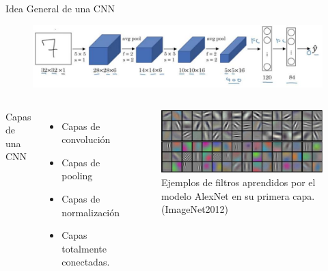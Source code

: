 \begin{frame}{Idea General de una CNN}

    \begin{figure}
            \hspace*{-1cm}   
            \includegraphics[keepaspectratio=true,height=1\paperheight,width=0.99\paperwidth]{Images/idea of cnn.png}
    \end{figure}
    \pause
    \begin{columns}
        \centering
        Capas de una CNN
        \begin{itemize}
            \item Capas de convolución
            \item Capas de pooling 
            \item Capas de normalización
            \item Capas totalmente conectadas.
        \end{itemize}
    \pause
        \centering
        \begin{figure}
            \includegraphics[width=1\linewidth]{Images/filtrosAlexNet.png}
            \caption{Ejemplos de filtros aprendidos por el modelo AlexNet en su primera capa. (ImageNet2012)}
        \end{figure}
    \end{columns}
\end{frame}


%
%



